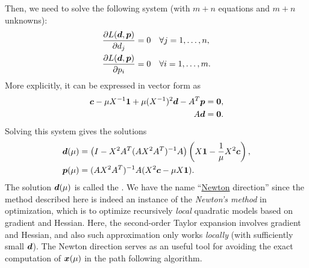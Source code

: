 \begin{enumerate}
\[\]
Then, we need to solve the following system (with \(m+n\) equations and \(m+n\)
unknowns):
\begin{align*}
\pdv{L(\bm{d},\bm{p})}{d_j}&=0\quad\forall j=1,\dotsc,n, \\
\pdv{L(\bm{d},\bm{p})}{p_i}&=0\quad\forall i=1,\dotsc,m.
\end{align*}
More explicitly, it can be expressed in vector form as
\begin{align*}
\bm{c}-\mu X^{-1}\bm{1}+\mu(X^{-1})^{2}\bm{d}-A^{T}\bm{p}&=\bm{0}, \\
A\bm{d}&=\bm{0}.
\end{align*}
Solving this system gives the solutions
\begin{align*}
\bm{d}(\mu)&=\left(I-X^{2}A^{T}(AX^{2}A^{T})^{-1}A\right)
\left(X\bm{1}-\frac{1}{\mu}X^{2}\bm{c}\right), \\
\bm{p}(\mu)&=(AX^{2}A^{T})^{-1}A(X^{2}\bm{c}-\mu X\bm{1}).
\end{align*}
The solution \(\bm{d}(\mu)\) is called the .  We have
the name ``\underline{Newton} direction'' since the method described here is
indeed an instance of the \emph{Newton's method} in optimization, which is to
optimize recursively \emph{local} quadratic models based on gradient and
Hessian. Here, the second-order Taylor expansion involves gradient and Hessian,
and also such approximation only works \emph{locally} (with sufficiently small
\(\bm{d}\)). The Newton direction serves as an useful tool for avoiding
the exact computation of \(\bm{x}(\mu)\) in the path following algorithm.


\end{enumerate}
